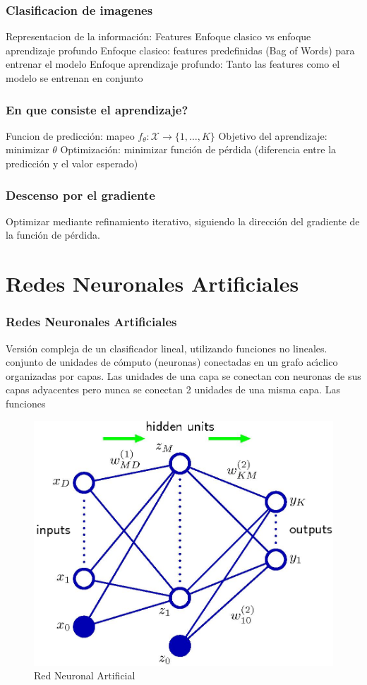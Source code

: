 \documentclass[12pt,center]{beamer}
\begin{document}
\begin{frame}
  \frametitle{Clasificacion de imagenes}
  Representacion de la información: Features
  Enfoque clasico vs enfoque aprendizaje profundo
    Enfoque clasico: features predefinidas (Bag of Words) para entrenar el modelo
    Enfoque aprendizaje profundo: Tanto las features como el modelo se entrenan en conjunto
\end{frame}

\begin{frame}
  \frametitle{En que consiste el aprendizaje?}
    Funcion de predicción: mapeo $f_{\theta}: \mathcal{X} {\rightarrow} \{1,\dots,K\}$
    Objetivo del aprendizaje: minimizar $\theta$
    Optimización: minimizar función de pérdida (diferencia entre la predicción y el valor esperado)
\end{frame}

\begin{frame}
  \frametitle{Descenso por el gradiente}
    Optimizar mediante refinamiento iterativo, siguiendo la dirección del gradiente de la función de pérdida.
\end{frame}

\section{Redes Neuronales Artificiales}
\begin{frame}
  \frametitle{Redes Neuronales Artificiales}
    Versión compleja de un clasificador lineal, utilizando funciones no lineales.
    conjunto de unidades de cómputo (neuronas) conectadas en un grafo acı́clico organizadas por capas. 
    Las unidades de una capa se conectan con neuronas de sus capas adyacentes pero nunca se conectan 2 unidades de una misma capa.
    Las funciones 
    \begin{figure}[ht]
      \begin{center}
	\includegraphics[width=0.8\linewidth]{./img/bishop_neural_network.jpg}
      \end{center}
      \caption{Red Neuronal Artificial}
      \label{fig:neural_network}
    \end{figure}
\end{frame}
\end{document}
